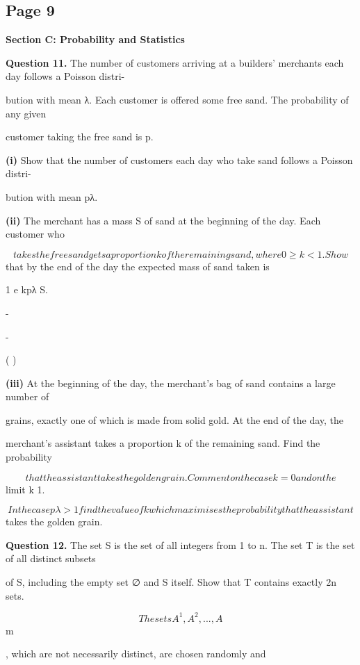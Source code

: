 \documentclass[12pt]{article}
\begin{document}
\subsection*{Page 9}
\begin{flushleft}
\bigskip\textbf{Section C: Probability and Statistics}\par
\bigskip\textbf{Question 11.} The number of customers arriving at a builders' merchants each day follows a Poisson distri-\par
bution with mean λ. Each customer is offered some free sand. The probability of any given\par
customer taking the free sand is p.\par
\textbf{(i)} Show that the number of customers each day who take sand follows a Poisson distri-\par
bution with mean pλ.\par
\textbf{(ii)} The merchant has a mass S of sand at the beginning of the day. Each customer who\par
\[takes the free sand gets a proportion k of the remaining sand, where 0 \geq k < 1. Show\]
that by the end of the day the expected mass of sand taken is\par
1 e kpλ S.\par
-\par
-\par
( )\par
\textbf{(iii)} At the beginning of the day, the merchant's bag of sand contains a large number of\par
grains, exactly one of which is made from solid gold. At the end of the day, the\par
merchant's assistant takes a proportion k of the remaining sand. Find the probability\par
\[that the assistant takes the golden grain. Comment on the case k = 0 and on the\]
limit k 1.\par
\to\par
\[In the case pλ > 1 find the value of k which maximises the probability that the assistant\]
takes the golden grain.\par
\bigskip\textbf{Question 12.} The set S is the set of all integers from 1 to n. The set T is the set of all distinct subsets\par
of S, including the empty set ∅ and S itself. Show that T contains exactly 2n sets.\par
\[The sets A^1, A^2, . . ., A\]
m\par
, which are not necessarily distinct, are chosen randomly and\par

\end{flushleft}
\end{document}
